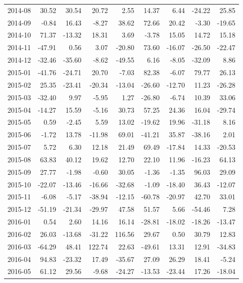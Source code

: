 \begin{table}[ht]
\begin{tabular}{lrrrrrrrr}
  2014-08 & 30.52 & 30.54 & 20.72 & 2.55 & 14.37 & 6.44 & -24.22 & 25.85 \\ 
  2014-09 & -0.84 & 16.43 & -8.27 & 38.62 & 72.66 & 20.42 & -3.30 & -19.65 \\ 
  2014-10 & 71.37 & -13.32 & 18.31 & 3.69 & -3.78 & 15.05 & 14.72 & 15.18 \\ 
  2014-11 & -47.91 & 0.56 & 3.07 & -20.80 & 73.60 & -16.07 & -26.50 & -22.47 \\ 
  2014-12 & -32.46 & -35.60 & -8.62 & -49.55 & 6.16 & -8.05 & -32.09 & 8.86 \\ 
  2015-01 & -41.76 & -24.71 & 20.70 & -7.03 & 82.38 & -6.07 & 79.77 & 26.13 \\ 
  2015-02 & 25.35 & -23.41 & -20.34 & -13.04 & -26.60 & -12.70 & 11.23 & -26.28 \\ 
  2015-03 & -32.40 & 9.97 & -5.95 & 1.27 & -26.80 & -6.74 & 10.39 & 33.06 \\ 
  2015-04 & -14.27 & 15.59 & -5.16 & 30.73 & 57.25 & 24.36 & 16.04 & -29.74 \\ 
  2015-05 & 0.59 & -2.45 & 5.59 & 13.02 & -19.62 & 19.96 & -31.18 & 8.16 \\ 
  2015-06 & -1.72 & 13.78 & -11.98 & 69.01 & -41.21 & 35.87 & -38.16 & 2.01 \\ 
  2015-07 & 5.72 & 6.30 & 12.18 & 21.49 & 69.49 & -17.84 & 14.33 & -20.53 \\ 
  2015-08 & 63.83 & 40.12 & 19.62 & 12.70 & 22.10 & 11.96 & -16.23 & 64.13 \\ 
  2015-09 & 27.77 & -1.98 & -0.60 & 30.05 & -1.36 & -1.35 & 96.03 & 29.09 \\ 
  2015-10 & -22.07 & -13.46 & -16.66 & -32.68 & -1.09 & -18.40 & 36.43 & -12.07 \\ 
  2015-11 & -6.08 & -5.17 & -38.94 & -12.15 & -60.78 & -20.97 & 42.70 & 33.01 \\ 
  2015-12 & -51.19 & -21.34 & -29.97 & 47.58 & 51.57 & 5.66 & -54.46 & 7.28 \\ 
  2016-01 & 0.54 & 2.60 & 14.16 & 16.14 & -28.81 & -18.02 & -18.26 & -13.47 \\ 
  2016-02 & 26.03 & -13.68 & -31.22 & 116.56 & 29.67 & 0.50 & 30.79 & 12.83 \\ 
  2016-03 & -64.29 & 48.41 & 122.74 & 22.63 & -49.61 & 13.31 & 12.91 & -34.83 \\ 
  2016-04 & 94.83 & -23.32 & 17.49 & -35.67 & 27.09 & 26.29 & 18.41 & -5.24 \\ 
  2016-05 & 61.12 & 29.56 & -9.68 & -24.27 & -13.53 & -23.44 & 17.26 & -18.04 \\ 

\end{tabular}
\end{table}
